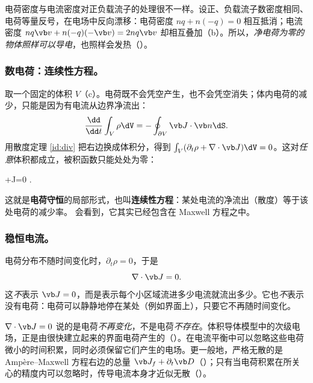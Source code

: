 电荷密度与电流密度对正负载流子的处理很不一样。设正、负载流子数密度相同、电荷等量反号，在电场中反向漂移：电荷密度 $nq+n(-q)=0$ 相互抵消；电流密度 $nq\vb v+n(-q)(-\vb v)=2nq\vb v$ 却相互叠加（b）。所以，\emph{净电荷为零的物体照样可以导电}，也照样会发热（）。


\subsubsection{数电荷：连续性方程。}
取一个固定的体积 $V$（c）。电荷既不会凭空产生，也不会凭空消失；体内电荷的减少，只能是因为有电流从边界净流出：
\begin{equation}
\frac{\dd}{\dd t}\int_V\rho\dV=-\oint_{\partial V}\vb J\cdot\vb n\dS .
\label{eq:electric-contint}
\end{equation}
用散度定理 \eqref{id:div} 把右边换成体积分，得到 $\int_V(\partial_t\rho+\nabla\cdot\vb J)\dV=0$。这对\emph{任意}体积都成立，被积函数只能处处为零：
\begin{keyeq}
+\nabla\cdot\vb J=0 .
\label{eq:continuity}
\end{keyeq}
这就是\textbf{电荷守恒}的局部形式，也叫\textbf{连续性方程}：某处电流的净流出（散度）等于该处电荷的减少率。 会看到，它其实已经包含在 Maxwell 方程之中。

\subsubsection{稳恒电流。}
电荷分布不随时间变化时，$\partial_t\rho=0$，于是
\begin{equation}
\nabla\cdot\vb J=0 .
\label{eq:electric-steady}
\end{equation}
这\emph{不}表示 $\vb J=0$，而是表示每个小区域流进多少电流就流出多少。它也\emph{不}表示没有电荷：电荷可以静静地停在某处（例如界面上），只要它不再随时间变化。

\begin{pitfall}[“既然 $\nabla\cdot\vb J=0$，导体里就没有电荷，也就没有电荷产生的电场”]
$\nabla\cdot\vb J=0$ 说的是电荷\emph{不再变化}，不是电荷\emph{不存在}。体积导体模型中的次级电场，正是由很快建立起来的界面电荷产生的（）。在电流平衡中可以忽略这些电荷微小的时间积累，同时必须保留它们产生的电场。更一般地，严格无散的是 Ampère--Maxwell 方程右边的总量 $\vb J_f+\partial_t\vb D$（）；只有当电荷积累在所关心的精度内可以忽略时，传导电流本身才近似无散（）。
\end{pitfall}

